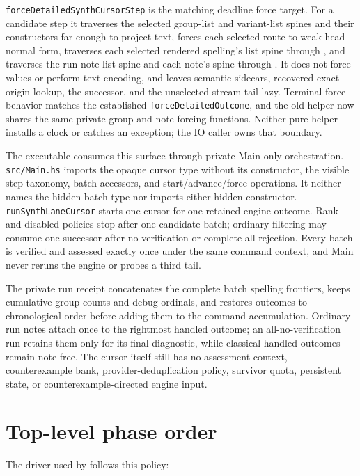\documentclass[10pt,letterpaper,oneside]{report}
\newcommand{\code}[1]{\texttt{\detokenize{#1}}}
\newcommand{\filepath}[1]{\nolinkurl{#1}}
\begin{document}
\nolinkurl{forceDetailedSynthCursorStep} is the matching deadline force target. For
a candidate step it traverses the selected group-list and variant-list spines
and their constructors far enough to project text, forces each selected route
to weak head normal form, traverses each selected rendered spelling's
\code{String} list spine through \code{length}, and traverses the run-note list
spine and each note's \code{String} spine through \code{length}. It does not
force \code{Char} values or perform text encoding, and leaves semantic sidecars,
recovered exact-origin lookup, the successor, and the unselected stream tail
lazy. Terminal force behavior matches the established
\nolinkurl{forceDetailedOutcome}, and the old helper now shares the same private
group and note forcing functions. Neither pure helper installs a clock or
catches an exception; the IO caller owns that boundary.

The executable consumes this surface through private Main-only orchestration.
\filepath{src/Main.hs} imports the opaque cursor type without its constructor,
the visible step taxonomy, batch accessors, and start/advance/force operations.
It neither names the hidden batch type nor imports either hidden constructor.
\nolinkurl{runSynthLaneCursor} starts one cursor for one retained
engine outcome. Rank and disabled policies stop after one candidate batch;
ordinary filtering may consume one successor after no verification or complete
all-rejection. Every batch is verified and assessed exactly once under the same
command context, and Main never reruns the engine or probes a third tail.

The private run receipt concatenates the complete batch spelling frontiers,
keeps cumulative group counts and debug ordinals, and restores outcomes to
chronological order before adding them to the command accumulation. Ordinary
run notes attach once to the rightmost handled outcome; an all-no-verification
run retains them only for its final diagnostic, while classical handled
outcomes remain note-free. The cursor itself still has no assessment context,
counterexample bank, provider-deduplication policy, survivor quota, persistent
state, or counterexample-directed engine input.

\section{Top-level phase order}

The driver used by \code{:synth} follows this policy:
\end{document}

